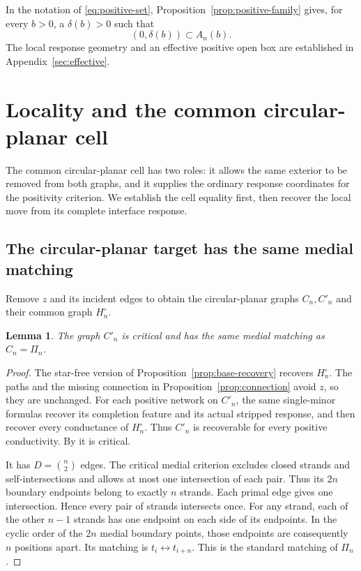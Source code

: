 \documentclass[11pt]{article}
\newtheorem{lemma}[theorem]{Lemma}
\theoremstyle{definition}
\begin{document}
In the notation of \eqref{eq:positive-set},
Proposition~\ref{prop:positive-family} gives, for every $b>0$, a
$\delta(b)>0$ such that
\begin{equation}
 (0,\delta(b))\subset A_n(b).
 \label{eq:initial-interval}
\end{equation}
The local response geometry and an effective positive open box are
established in Appendix~\ref{sec:effective}.

\section{Locality and the common circular-planar cell}
\label{sec:locality}

The common circular-planar cell has two roles: it allows the same
exterior to be removed from both graphs, and it supplies the ordinary
response coordinates for the positivity criterion. We establish the
cell equality first, then recover the local move from its complete
interface response.

\subsection{The circular-planar target has the same medial matching}

Remove \(z\) and its incident edges to obtain the circular-planar
graphs \(C_n,C'_n\) and their common graph \(H_n^\circ\).

\begin{lemma}
\label{lem:target-critical}
The graph \(C'_n\) is critical and has the same medial matching as
\(C_n=\Pi_n\).
\end{lemma}
\begin{proof}
The star-free version of Proposition~\ref{prop:base-recovery}
recovers \(H_n^\circ\).
The paths and the missing connection in
Proposition~\ref{prop:connection} avoid \(z\), so they are unchanged.
For each positive network on \(C'_n\), the same single-minor
formulas recover its completion feature and its actual stripped
response, and then recover every conductance of \(H_n^\circ\).
Thus \(C'_n\) is recoverable for every positive conductivity.
By \cite[Lemma 13.2]{CIM} it is critical.

It has \(D=\binom n2\) edges.
The critical medial criterion excludes closed strands and
self-intersections and allows at most one intersection of each pair.
Thus its \(2n\) boundary endpoints belong to exactly \(n\) strands.
Each primal edge gives one intersection. Hence every pair of strands intersects once.
For any strand, each of the other \(n-1\) strands has one endpoint
on each side of its endpoints. In the cyclic order of the \(2n\)
medial boundary points, those endpoints are consequently \(n\)
positions apart. Its matching is
\(t_i\leftrightarrow t_{i+n}\).
This is the standard matching of \(\Pi_n\).
\end{proof}
\end{document}

